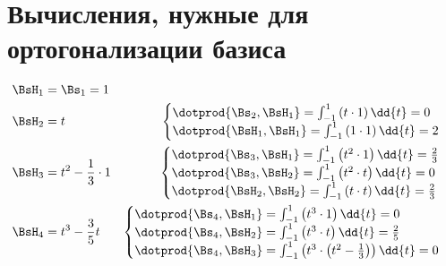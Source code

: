 \section{Вычисления, нужные для ортогонализации базиса} \label{app:a-1-calc}

\begin{align*}
\BsH_1 &= \Bs_1 = 1 & \\
\BsH_2 &= t &
\begin{cases}
  \dotprod{\Bs_2, \BsH_1}
    = \int_{-1}^{1} \left( t \cdot 1 \right) \dd{t} = 0 \\
  \dotprod{\BsH_1, \BsH_1}
    = \int_{-1}^{1} \left( 1 \cdot 1 \right) \dd{t} = 2
\end{cases} \\
\BsH_3 &= t^2 - \frac{1}{3} \cdot 1 &
\begin{cases}
  \dotprod{\Bs_3, \BsH_1}
    = \int_{-1}^{1} \left( t^2 \cdot 1 \right) \dd{t} = \frac{2}{3} \\
  \dotprod{\Bs_3, \BsH_2}
    = \int_{-1}^{1} \left( t^2 \cdot t \right) \dd{t} = 0 \\
  \dotprod{\BsH_2, \BsH_2}
    = \int_{-1}^{1} \left( t \cdot t \right) \dd{t} = \frac{2}{3}
\end{cases} \\
\BsH_4 &= t^3 - \frac{3}{5} t &
\begin{cases}
  \dotprod{\Bs_4, \BsH_1}
    = \int_{-1}^{1} \left( t^3 \cdot 1 \right) \dd{t} = 0 \\
  \dotprod{\Bs_4, \BsH_2}
    = \int_{-1}^{1} \left( t^3 \cdot t \right) \dd{t} = \frac{2}{5} \\
  \dotprod{\Bs_4, \BsH_3}
    = \int_{-1}^{1}
      \left( t^3 \cdot \left( t^2 - \frac{1}{3} \right) \right) \dd{t} = 0
\end{cases}
\end{align*}
